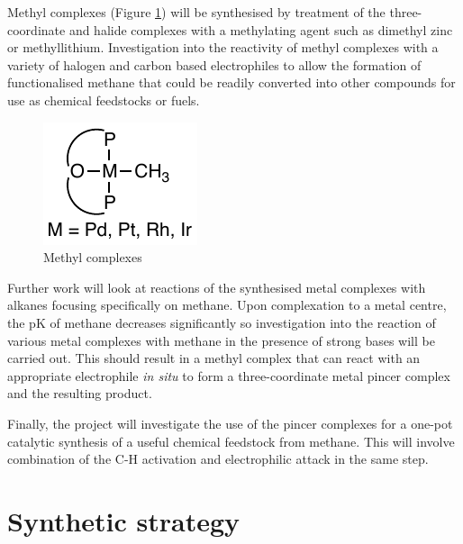 Methyl complexes (Figure \ref{Methylcomplexes}) will be synthesised by treatment of the three-coordinate and halide complexes with a methylating agent such as dimethyl zinc or methyllithium. Investigation into the reactivity of methyl complexes with a variety of halogen and carbon based electrophiles to allow the formation of functionalised methane that could be readily converted into other compounds for use as chemical feedstocks or fuels.  
 

\begin{figure}[h]  
\centering
\includegraphics[]{../Figures/Methylcomplexes.pdf}
\caption[Methyl complexes]{Methyl complexes}
\label{Methylcomplexes}
\end{figure}

Further work will look at reactions of the synthesised metal complexes with alkanes focusing specifically on methane.  Upon complexation to a metal centre, the pK of methane decreases significantly so investigation into the reaction of various metal complexes with methane in the presence of strong bases will be carried out.  This should result in a methyl complex that can react with an appropriate electrophile \emph{in situ} to form a three-coordinate metal pincer complex and the resulting product.

Finally, the project will investigate the use of the pincer complexes for a one-pot catalytic synthesis of a useful chemical feedstock from methane.  This will involve combination of the C-H activation and electrophilic attack in the same step.

\section{Synthetic strategy}

